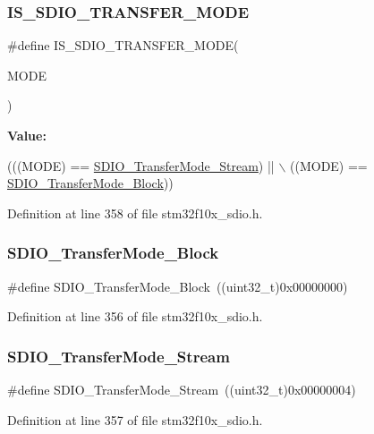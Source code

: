 \subsubsection{\texorpdfstring{I\+S\+\_\+\+S\+D\+I\+O\+\_\+\+T\+R\+A\+N\+S\+F\+E\+R\+\_\+\+M\+O\+DE}{IS\_SDIO\_TRANSFER\_MODE}}
{\footnotesize\ttfamily \#define I\+S\+\_\+\+S\+D\+I\+O\+\_\+\+T\+R\+A\+N\+S\+F\+E\+R\+\_\+\+M\+O\+DE(\begin{DoxyParamCaption}\item[{}]{M\+O\+DE }\end{DoxyParamCaption})}

{\bfseries Value\+:}
\begin{DoxyCode}
(((MODE) == \hyperlink{group___s_d_i_o___transfer___type_gadd0cafe0a80e6b6cc5c22d838cbb2e28}{SDIO\_TransferMode\_Stream}) || \(\backslash\)
                                     ((MODE) == \hyperlink{group___s_d_i_o___transfer___type_ga5b54ada18cc4072ceff1d98ee4b69972}{SDIO\_TransferMode\_Block}))
\end{DoxyCode}


Definition at line 358 of file stm32f10x\+\_\+sdio.\+h.

\mbox{\label{group___s_d_i_o___transfer___type_ga5b54ada18cc4072ceff1d98ee4b69972}} 
\subsubsection{\texorpdfstring{S\+D\+I\+O\+\_\+\+Transfer\+Mode\+\_\+\+Block}{SDIO\_TransferMode\_Block}}
{\footnotesize\ttfamily \#define S\+D\+I\+O\+\_\+\+Transfer\+Mode\+\_\+\+Block~((uint32\+\_\+t)0x00000000)}



Definition at line 356 of file stm32f10x\+\_\+sdio.\+h.

\mbox{\label{group___s_d_i_o___transfer___type_gadd0cafe0a80e6b6cc5c22d838cbb2e28}} 
\subsubsection{\texorpdfstring{S\+D\+I\+O\+\_\+\+Transfer\+Mode\+\_\+\+Stream}{SDIO\_TransferMode\_Stream}}
{\footnotesize\ttfamily \#define S\+D\+I\+O\+\_\+\+Transfer\+Mode\+\_\+\+Stream~((uint32\+\_\+t)0x00000004)}



Definition at line 357 of file stm32f10x\+\_\+sdio.\+h.

